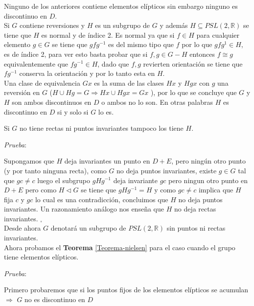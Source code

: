 Ninguno de los anteriores contiene elementos el\'ipticos sin embargo
ninguno es discontinuo en $D$.\\

Si $G$ contiene reversiones  y $H$ es un subgrupo de $G$ y adem\'as $H
\subseteq PSL(2,\mathbb{R})$ se tiene que $H$  es normal y de \'indice 2. Es normal ya que si $f \in H$
para cualquier elemento $g \in G$ se tiene que $gfg^{-1}$ es del
mismo tipo que $f$ por lo que $gfg^{1} \in H$, es de \'indice 2,
para ver esto basta probar que si $f,g \in G - H$ entonces $f \cong
g$ equivalentemente que $fg^{-1} \in H$, dado que $f , g$ revierten
orientaci\'on  se tiene que $fg^{-1}$ conserva la orientaci\'on y
por lo tanto esta en
$H$. \\

Una clase de equivalencia $Gx$ es la suma de las clases $Hx$ y $Hgx$
con $g$ una reversi\'on en $G$ ($H \cup Hg = G \Rightarrow Hx \cup
Hgx = Gx $ ), por lo que se concluye que $G$ y $H$
son ambos discontinuos en $D$ o ambos no lo son. En otras palabras $H$ es discontinuo en $D$ si y solo si $G$ lo es.


\begin{prop} Si $G$ no tiene rectas ni puntos invariantes tampoco los
tiene $H$.
\end{prop}

\textit{Prueba}:

 Supongamos que $H$ deja invariantes un punto en $D +E$,
pero ning\'un otro punto (y por tanto ninguna recta), como $G$ no
deja puntos invariantes, existe $g \in G $ tal que $gc \neq c$ luego
el subgrupo $gHg^{-1}$ deja invariante $gc$ pero ningun otro punto en
$D+E$ pero como $H \vartriangleleft G$ se tiene que  $gHg^{-1}=H$ y
como $gc \neq c $ implica que $H$ fija $c$ y $gc$ lo cual es una
contradicci\'on, concluimos que $H$ no deja puntos invariantes. Un
razonamiento an\'alogo nos enseña que $H$ no deja rectas invariantes. $_{\square}$ \\


Desde ahora  $G$ denotar\'a un subgrupo de $PSL(2,\mathbb{R})$ sin
puntos ni rectas invariantes. \\

Ahora probamos el \textbf{Teorema} \ref{Teorema-nielsen} para el caso cuando el grupo tiene elementos el\'ipticos.

\textit{Prueba}:

Primero probaremos que si los puntos fijos de los elementos el\'ipticos se
acumulan $\Rightarrow$ $G$ no es discontinuo en $D$ \\

